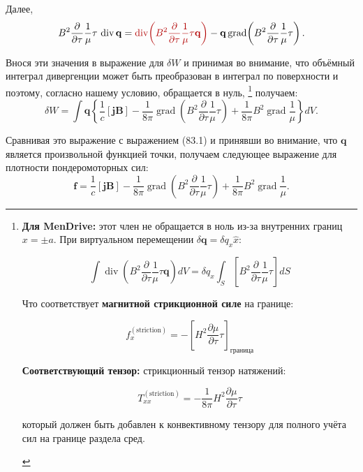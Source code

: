 \documentclass[a4paper,10pt]{article}
\newcommand{\redtext}[1]{\textcolor{redcolor}{#1}}
\newcommand{\redmath}[1]{\textcolor{redcolor}{#1}}
\newcommand{\modblock}[1]{\colorbox{modcolor!10}{\parbox{\dimexpr\linewidth-2\fboxsep}{#1}}}
\begin{document}
Далее,
$$
    B^2\frac{\partial}{\partial\tau}\frac{1}{\mu}\tau\,\operatorname{div}\mathbf{q}
    = \redmath{\operatorname{div}\!\left(B^2\frac{\partial}{\partial\tau}\frac{1}{\mu}\tau\mathbf{q}\right)}
    - \mathbf{q}\operatorname{grad}\!\left(B^2\frac{\partial}{\partial\tau}\frac{1}{\mu}\tau\right).
$$

Внося эти значения в выражение для $\delta W$ и принимая во внимание,
что объёмный интеграл дивергенции может быть преобразован в интеграл
по поверхности \redtext{и поэтому, согласно нашему условию, обращается в нуль},
\footnote{
\modblock{
\textbf{Для MenDrive:} этот член не обращается в ноль из-за внутренних
границ $x = \pm a$. При виртуальном перемещении $\delta\mathbf{q} = \delta q_x\hat{x}$:

\begin{equation}
\int \operatorname{div}\!\left(B^2\frac{\partial}{\partial\tau}\frac{1}{\mu}\tau\mathbf{q}\right) dV =
\delta q_x \int_{S}\left[B^2\frac{\partial}{\partial\tau}\frac{1}{\mu}\tau\right] dS
\label{eq:magnetic_striction_surface}
\end{equation}

Что соответствует \textbf{магнитной стрикционной силе} на границе:

\begin{equation}
f_x^{(\text{striction})} = -\left[H^2\frac{\partial\mu}{\partial\tau}\tau\right]_{\text{граница}}
\label{eq:striction_force}
\end{equation}

\textbf{Соответствующий тензор:} стрикционный тензор натяжений:

\begin{equation}
T_{xx}^{(\text{striction})} = -\frac{1}{8\pi}H^2\frac{\partial\mu}{\partial\tau}\tau
\label{eq:striction_tensor}
\end{equation}

который должен быть добавлен к конвективному тензору для полного
учёта сил на границе раздела сред.
} %
} %
получаем:
$$
    \delta W = \int\mathbf{q}\left\{
        \frac{1}{c}[\mathbf{j}\mathbf{B}]
        - \frac{1}{8\pi}\operatorname{grad}\!\left(B^2\frac{\partial}{\partial\tau}\frac{1}{\mu}\tau\right)
        + \frac{1}{8\pi}B^2\operatorname{grad}\frac{1}{\mu}
    \right\}dV.
$$

Сравнивая это выражение с выражением (83.1) и принявши во внимание,
что $\mathbf{q}$ является произвольной функцией точки, получаем следующее
выражение для плотности пондеромоторных сил:
\begin{equation}
    \mathbf{f} = \frac{1}{c}[\mathbf{j}\mathbf{B}]
               - \frac{1}{8\pi}\operatorname{grad}\!\left(
                   B^2\frac{\partial}{\partial\tau}\frac{1}{\mu}\tau
               \right)
               + \frac{1}{8\pi}B^2\operatorname{grad}\frac{1}{\mu}.
    \tag{83.3}
\end{equation}
\end{document}
